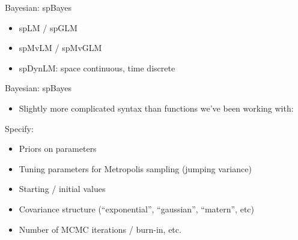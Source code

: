\documentclass[
  ignorenonframetext,
]{beamer}
\providecommand{\tightlist}{%
  \setlength{\itemsep}{0pt}\setlength{\parskip}{0pt}}
\begin{document}
\begin{frame}{Bayesian: spBayes}
\protect\hypertarget{bayesian-spbayes-1}{}

\begin{itemize}
\item
  spLM / spGLM
\item
  spMvLM / spMvGLM
\item
  spDynLM: space continuous, time discrete
\end{itemize}

\end{frame}

\begin{frame}{Bayesian: spBayes}
\protect\hypertarget{bayesian-spbayes-2}{}

\begin{itemize}
\tightlist
\item
  Slightly more complicated syntax than functions we've been working
  with:
\end{itemize}

Specify:

\begin{itemize}
\tightlist
\item
  Priors on parameters
\item
  Tuning parameters for Metropolis sampling (jumping variance)
\item
  Starting / initial values
\item
  Covariance structure (``exponential'', ``gaussian'', ``matern'', etc)
\item
  Number of MCMC iterations / burn-in, etc.
\end{itemize}

\end{frame}
\end{document}
